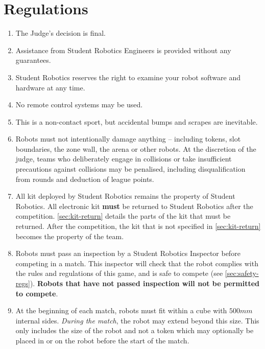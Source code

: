 \section {Regulations}
\label{sec:Regulations}

\begin{enumerate}


\item The Judge's decision is final.
\item Assistance from Student Robotics Engineers is provided without any guarantees.
\item Student Robotics reserves the right to examine your robot software and hardware at any time.


\item No remote control systems may be used.
\item This is a non-contact sport, but accidental bumps and scrapes are inevitable.
\item Robots must not intentionally damage anything -- including tokens, slot boundaries, the zone wall, the arena or other robots.
      At the discretion of the judge, teams who deliberately engage in collisions or take insufficient precautions against collisions may be penalised, including disqualification from rounds and deduction of league points.
\item All kit deployed by Student Robotics remains the property of Student Robotics.
      All electronic kit \textbf{must} be returned to Student Robotics after the competition.
      \autoref{sec:kit-return} details the parts of the kit that must be returned.
      After the competition, the kit that is not specified in \autoref{sec:kit-return} becomes the property of the team.


\item Robots must pass an inspection by a Student Robotics Inspector before competing in a match.
      This inspector will check that the robot complies with the rules and regulations of this game, and is safe to compete (see \autoref{sec:safety-regs}).
      \textbf{Robots that have not passed inspection will not be permitted to compete}.

\item At the beginning of each match, robots must fit within a cube with $500mm$ internal sides.
      \textit{During the match}, the robot may extend beyond this size. This only includes the size of the robot and not a token which may optionally be placed in or on the robot before the start of the match.


\end{enumerate}
